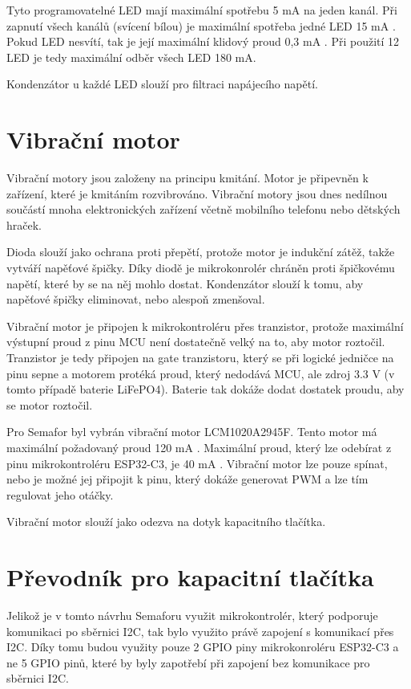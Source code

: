 
Tyto programovatelné LED mají maximální spotřebu 5 mA na jeden kanál. Při zapnutí všech kanálů (svícení bílou) je maximální
spotřeba jedné LED 15 mA \cite{WS2812C_dtsh}. Pokud LED nesvítí, tak je její maximální klidový proud 0,3 mA \cite{WS2812C_dtsh}.
Při použití 12 LED je tedy maximální odběr všech LED 180 mA.

Kondenzátor u každé LED slouží pro filtraci napájecího napětí. 



\section{Vibrační motor}
Vibrační motory jsou založeny na principu kmitání. Motor je připevněn k zařízení, které je kmitáním rozvibrováno. Vibrační motory jsou dnes 
nedílnou součástí mnoha elektronických zařízení včetně mobilního telefonu nebo dětských hraček. 

Dioda slouží jako ochrana proti přepětí, protože motor je indukční zátěž, takže vytváří napěťové špičky. Díky diodě je mikrokonrolér chráněn 
proti špičkovému napětí, které by se na něj mohlo dostat. Kondenzátor slouží k tomu, aby napěťové špičky eliminovat, nebo alespoň zmenšoval. 

Vibrační motor je připojen k mikrokontroléru přes tranzistor, protože maximální výstupní proud z pinu MCU není dostatečně velký na to, aby 
motor roztočil. Tranzistor je tedy připojen na gate tranzistoru, který se při logické jedničce na pinu sepne a motorem protéká proud, který 
nedodává MCU, ale zdroj 3.3 V (v tomto případě baterie LiFePO4). Baterie tak dokáže dodat dostatek proudu, aby se motor roztočil. 

Pro Semafor byl vybrán vibrační motor LCM1020A2945F. Tento motor má maximální požadovaný proud 120 mA \cite{vib_motor_dtsh}. Maximální proud, 
který lze odebírat z pinu mikrokontroléru ESP32-C3, je 40 mA \cite{ESP_C3_dtsh}. Vibrační motor lze pouze spínat, nebo je možné jej připojit 
k pinu, který dokáže generovat PWM a lze tím regulovat jeho otáčky. 

Vibrační motor slouží jako odezva na dotyk kapacitního tlačítka. 


\section{Převodník pro kapacitní tlačítka}
Jelikož je v tomto návrhu Semaforu využit mikrokontrolér, který podporuje komunikaci po sběrnici I2C, tak bylo využito právě zapojení s komunikací 
přes I2C. Díky tomu budou využity pouze 2 GPIO piny mikrokonroléru ESP32-C3 a ne 5 GPIO pinů, které by byly zapotřebí při zapojení bez komunikace pro
sběrnici I2C.

